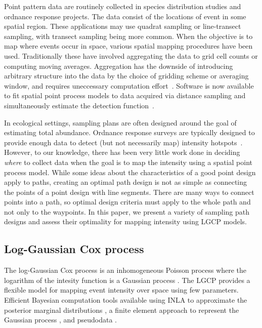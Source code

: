 \documentclass[review]{elsarticle}
\begin{document}
Point pattern data are routinely collected in species distribution studies and
ordnance response projects. The data consist of the locations of event in some
spatial region. These applications may use quadrat sampling or line-transect
sampling, with transect sampling being more common. When the objective is to
map where events occur in space, various spatial mapping procedures have been
used. Traditionally these have involved aggregating the data to grid cell
counts or computing moving averages. Aggregation has the downside of
introducing arbitrary structure into the data by the choice of gridding scheme
or averaging window, and requires uneccessary computation
effort~\citep{simpsonetal}. Software is now available to fit spatial point
process models to data acquired via distance sampling and simultaneously
estimate the detection function~\citep{dspat,baser}.

In ecological settings, sampling plans are often designed around the goal of
estimating total abundance. Ordnance response surveys are typically designed
to provide enough data to detect (but not necessarily map) intensity
hotspots~\citep{em200-1-15,flaggetal}. However, to our knowledge, there has
been very little work done in deciding \emph{where} to collect data when the
goal is to map the intensity using a spatial point process model. While some
ideas about the characteristics of a good point design apply to paths, creating
an optimal path design is not as simple as connecting the points of a point
design with line segments. There are many ways to connect points into a path,
so optimal design criteria must apply to the whole path and not only to the
waypoints. In this paper, we present a variety of sampling path designs and
assess their optimality for mapping intensity using LGCP models.


\subsection{Log-Gaussian Cox process}

The log-Gaussian Cox process is an inhomogeneous Poisson process where the
logarithm of the intesity function is a Gaussian process \citep{moelleretal}.
The LGCP provides a flexible model for mapping event intensity over space using
few parameters. Efficient Bayesian computation tools available using INLA
to approximate the posterior marginal distributions \cite{rueetal}, a finite
element approach to represent the Gaussian process \cite{lindgrenetal}, and
pseudodata \cite{simpsonetal}.
\end{document}
